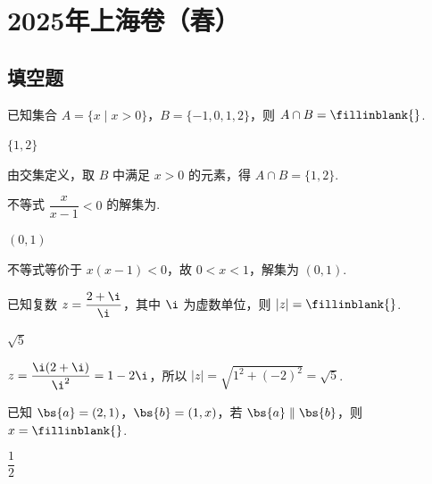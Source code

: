\chapter{2025年上海卷（春）}

\section{填空题}

\begin{problem}
已知集合 \(A=\{x\mid x>0\}\)，\(B=\{-1,0,1,2\}\)，则 \(A\cap B=\fillinblank{}\).
\end{problem}

\begin{answer}
\(\{1,2\}\)
\end{answer}

\begin{solution}
由交集定义，取 \(B\) 中满足 \(x>0\) 的元素，得 \(A\cap B=\{1,2\}\).
\end{solution}

\begin{problem}
不等式 \(\dfrac{x}{x-1}<0\) 的解集为\fillinblank{}.
\end{problem}

\begin{answer}
\((0,1)\)
\end{answer}

\begin{solution}
不等式等价于 \(x(x-1)<0\)，故 \(0<x<1\)，解集为 \((0,1)\).
\end{solution}

\begin{problem}
已知复数 \(z=\dfrac{2+\i}{\i}\)，其中 \(\i\) 为虚数单位，则 \(|z|=\fillinblank{}\).
\end{problem}

\begin{answer}
\(\sqrt5\)
\end{answer}

\begin{solution}
\(z=\dfrac{\i(2+\i)}{\i^2}=1-2\i\)，所以 \(|z|=\sqrt{1^2+(-2)^2}=\sqrt5\).
\end{solution}

\begin{problem}
已知 \(\bs{a}=(2,1)\)，\(\bs{b}=(1,x)\)，若 \(\bs{a}\parallel\bs{b}\)，则 \(x=\fillinblank{}\).
\end{problem}

\begin{answer}
\(\dfrac12\)
\end{answer}

